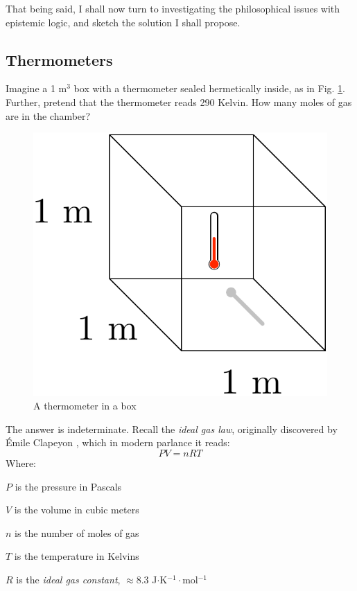 \documentclass[11pt]{article}
\numberwithin{equation}{subsection}
\begin{document}
That being said, I shall now turn to investigating the philosophical
issues with epistemic logic, and sketch the solution I shall propose.

\subsection{Thermometers}\label{thermometers}

Imagine a 1 m$^3$ box with a thermometer sealed hermetically inside,
as in Fig.  \ref{fig:therm1}.  Further, pretend that the thermometer
reads 290 Kelvin.  How many moles of gas are in the chamber?

\begin{figure}[ht]
\begin{center}
\includegraphics[scale=.5]{thermometer.pdf}
\end{center}
\caption{A thermometer in a box}
\label{fig:therm1}
\end{figure}

The answer is indeterminate.  Recall the \emph{ideal gas law}, originally discovered by \'{E}mile Clapeyon
\citep{clapeyron_mmoire_1834}, which in modern parlance it reads:
\[ P V = n R T\]
Where:
\begin{bul}
\item $P$ is the pressure in Pascals
\item $V$ is the volume in cubic meters
\item $n$ is the number of moles of gas
\item $T$ is the temperature in Kelvins
\item $R$ is the \emph{ideal gas constant}, $\approx 8.3$
  J$\cdot$K$^{-1}\cdot$mol$^{-1}$
\end{bul}
\end{document}
